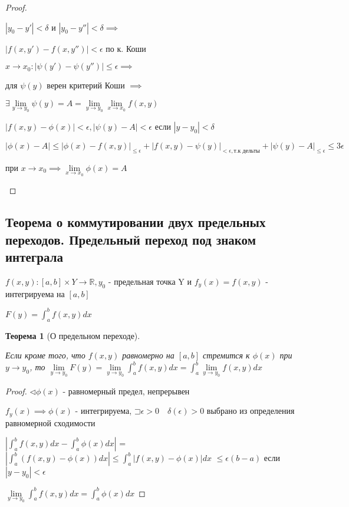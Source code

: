 \documentclass[a4paper]{article}
\newcommand\letsymbol{\mathord{\sqsupset}}
\newtheorem{theorem}{Теорема}[section]
\theoremstyle{definition}
\theoremstyle{remark}
\begin{document}
\begin{proof}
\begin{enumerate}
         $|y_0 - y'| < \delta$ и $|y_0-y''|< \delta \implies$
    
         $|f(x,y') - f(x,y'')|< \epsilon$ по к. Коши
    
         $x \to x_0 : |\psi(y') - \psi(y'')| \leq \epsilon \implies$
         
         для $\psi(y)$ верен критерий Коши $\implies$
    
         $\exists \lim\limits_{y \to y_0}\psi(y) = A = \lim\limits_{y \to y_0}\lim\limits_{x \to x_0}f(x,y)$
    
         $|f(x,y) - \phi(x)|< \epsilon, |\psi(y) - A|< \epsilon$ если $|y - y_0|< \delta$
    
         $|\phi(x)-A| \leq {|\phi(x) - f(x,y)|}_{\leq\epsilon}+{|f(x,y) - \psi(y)|}_{<\epsilon, \text{т.к дельты}} + {|\psi(y) - A|}_{\leq\epsilon} \leq 3\epsilon$
    
         при $x \to x_0 \implies \lim\limits_{x\to x_0}\phi(x) = A$ 
    \end{enumerate}
\end{proof}

    \subsection{	Теорема о коммутировании двух предельных переходов. Предельный переход под  знаком интеграла}

    $f(x,y): [a,b]\times Y\rightarrow\mathbb{R}, y_0$ - предельная точка Y и 
    $f_y(x) = f(x,y)$ - интегрируема на $[a,b]$
    
    $F(y) = \int_{a}^bf(x,y)dx$
    \begin{theorem}[О предельном переходе] \hypertarget{p2}{}
         Если кроме того, что $f(x,y)$ равномерно на $[a,b]$ стремится к $\phi(x)$ при $y\to y_0$, то
         $\lim\limits_{y\to y_0}F(y) = \lim\limits_{y\to y_0}\int_{a}^bf(x,y)dx = \int_{a}^b \lim\limits_{y\to y_0} f(x,y)dx$
    \end{theorem}
    \begin{proof}
         $\triangleleft \phi(x)$ - равномерный предел, непрерывен
    
    $f_y(x)\implies \phi(x) $ - интегрируема, $\letsymbol{} \epsilon > 0 \quad \delta(\epsilon)>0$ выбрано из
    определения равномерной сходимости
    
    $|\int_{a}^bf(x,y)dx - \int_{a}^b\phi(x)dx|$ = $|\int_{a}^b(f(x,y) - \phi(x))dx| \leq \int_{a}^b|f(x,y) - \phi(x)|dx$
    $\leq \epsilon(b-a)$ если $|y - y_0|<\epsilon$
    
    $\lim\limits_{y\to y_0}\int_{a}^b f(x,y)dx = \int_{a}^b \phi(x) dx$
    \end{proof}
\end{document}
